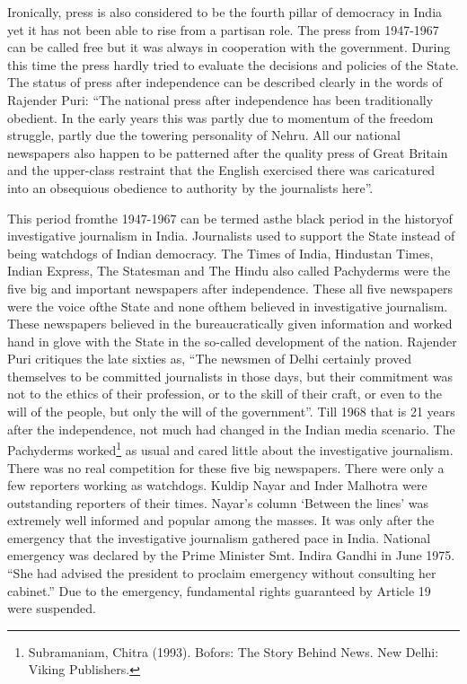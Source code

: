 \begin{multicols}{2}

\noi
Ironically, press is also considered to be the fourth pillar of democracy in India yet it has not
been able to rise from a partisan role. The press from 1947-1967 can be called free but it was
always in cooperation with the government. During this time the press hardly tried to evaluate the decisions and policies of the State. The status of press after independence can be described
clearly in the words of Rajender Puri: “The national press after independence has been
traditionally obedient. In the early years this was partly due to momentum of the freedom
struggle, partly due the towering personality of Nehru. All our national newspapers also happen
to be patterned after the quality press of Great Britain and the upper-class restraint that the
English exercised there was caricatured into an obsequious obedience to authority by the
journalists here”.


\noi
This period fromthe 1947-1967 can be termed asthe black period in the historyof investigative
journalism in India. Journalists used to support the State instead of being watchdogs of Indian
democracy. The Times of India, Hindustan Times, Indian Express, The Statesman and The
Hindu also called Pachyderms were the five big and important newspapers after independence.
These all five newspapers were the voice ofthe State and none ofthem believed in investigative
journalism. These newspapers believed in the bureaucratically given information and worked
hand in glove with the State in the so-called development of the nation. Rajender Puri critiques
the late sixties as, “The newsmen of Delhi certainly proved themselves to be committed
journalists in those days, but their commitment was not to the ethics of their profession, or to
the skill of their craft, or even to the will of the people, but only the will of the government”.
Till 1968 that is 21 years after the independence, not much had changed in the Indian media
scenario. The Pachyderms worked\footnote{Subramaniam, Chitra (1993). Bofors: The Story Behind News. New Delhi: Viking Publishers.} as usual and cared little about the investigative journalism.
There was no real competition for these five big newspapers. There were only a few reporters
working as watchdogs. Kuldip Nayar and Inder Malhotra were outstanding reporters of their
times. Nayar’s column ‘Between the lines’ was extremely well informed and popular among
the masses. It was only after the emergency that the investigative journalism gathered pace in
India. National emergency was declared by the Prime Minister Smt. Indira Gandhi in June
1975. “She had advised the president to proclaim emergency without consulting her cabinet.”
Due to the emergency, fundamental rights guaranteed by Article 19 were suspended.


\end{multicols}
